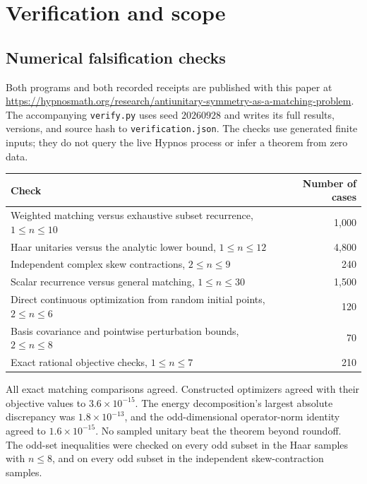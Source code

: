 \documentclass[11pt]{article}
\begin{document}
\section{Verification and scope}\label{sec:provenance}

\subsection{Numerical falsification checks}

Both programs and both recorded receipts are published with this paper at
\url{https://hypnosmath.org/research/antiunitary-symmetry-as-a-matching-problem}.
The accompanying \texttt{verify.py} uses seed $20260928$ and writes its
full results, versions, and source hash to \texttt{verification.json}.
The checks use generated finite inputs; they do not query the live
Hypnos process or infer a theorem from zero data.

\begin{center}
\begin{tabular}{@{}lr@{}}
\toprule
Check & Number of cases\\
\midrule
Weighted matching versus exhaustive subset recurrence, $1\leq n\leq10$ & 1,000\\
Haar unitaries versus the analytic lower bound, $1\leq n\leq12$ & 4,800\\
Independent complex skew contractions, $2\leq n\leq9$ & 240\\
Scalar recurrence versus general matching, $1\leq n\leq30$ & 1,500\\
Direct continuous optimization from random initial points, $2\leq n\leq6$ & 120\\
Basis covariance and pointwise perturbation bounds, $2\leq n\leq8$ & 70\\
Exact rational objective checks, $1\leq n\leq7$ & 210\\
\bottomrule
\end{tabular}
\end{center}

All exact matching comparisons agreed. Constructed optimizers agreed
with their objective values to $3.6\times10^{-15}$. The energy
decomposition's largest absolute discrepancy was $1.8\times10^{-13}$,
and the odd-dimensional operator-norm identity agreed to
$1.6\times10^{-15}$. No sampled unitary beat the theorem beyond
roundoff. The odd-set inequalities were checked on every odd subset
in the Haar samples with $n\leq8$, and on every odd subset in the
independent skew-contraction samples.
\end{document}
